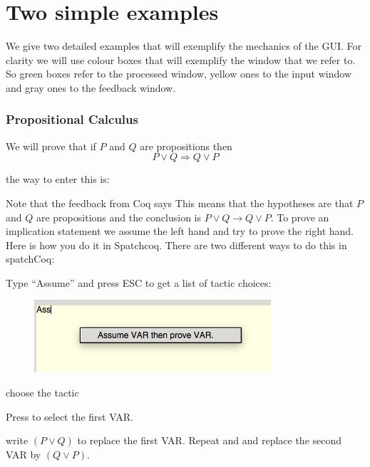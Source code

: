 
\chapter{Two simple examples}
We give two detailed examples that will exemplify the mechanics of the GUI. For clarity we will use colour boxes that will exemplify the window that we refer to. So green boxes refer to the processed window, yellow ones to the input window and gray ones to the feedback window.

\subsection{Propositional Calculus}

We will prove that if $P$ and $Q$ are propositions then $$P\lor Q \Rightarrow Q\lor P$$

the way to enter this is:

 
 Note that  the feedback from Coq says 
This means that the hypotheses are that $P$ and $Q$ are propositions and the conclusion is $ P \lor Q \rightarrow Q \lor P$. To prove an implication  statement we assume the left hand and try to prove the right hand. Here is how you do it in Spatchcoq. There are two different ways to do this in spatchCoq:

Type ``Assume'' and press ESC to get a list of tactic choices:

\begin{figure}[h!]
\includegraphics[scale=0.5]{Installation/Escape.png}


\label{tactics}
\end{figure}

choose the tactic

\noindent
{}

Press \VAR to select the first VAR.

write $( P \lor Q )$ to replace the first VAR. Repeat \VAR and and replace the second VAR by $(Q \lor P)$.



